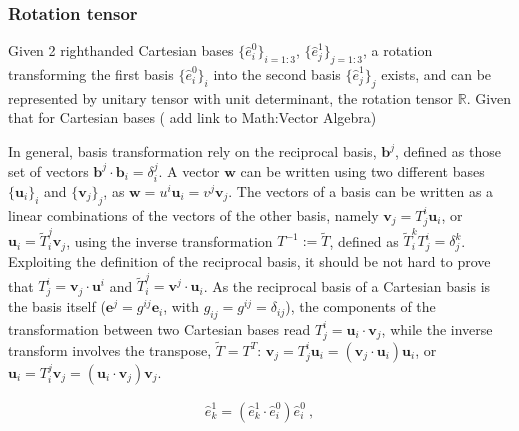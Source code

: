 \documentclass[letterpaper,10pt,english]{jupyterBook}
\begin{document}
\subsubsection{Rotation tensor}
\label{\detokenize{ch/kinematics-rotations-tensors:rotation-tensor}}\label{\detokenize{ch/kinematics-rotations-tensors:classical-mechanics-kinematics-rotations-tensor-components}}
\sphinxAtStartPar
Given 2 right\sphinxhyphen{}handed Cartesian bases \(\{ \hat{e}^0_i \}_{i=1:3}\), \(\{ \hat{e}^1_j \}_{j=1:3}\), a rotation transforming the first basis \(\{ \hat{e}^0_i \}_i\) into the second basis \(\{ \hat{e}^1_j \}_j\) exists, and can be represented by unitary tensor with unit determinant, the rotation tensor \(\mathbb{R}\).
Given that for Cartesian bases ( add link to Math:Vector Algebra)%
\begin{footnote}[1]\sphinxAtStartFootnote
In general, basis transformation rely on the reciprocal basis,
\(\mathbf{b}^j\), defined as those set of vectors \(\mathbf{b}^j \cdot \mathbf{b}_i = \delta_i^j\). A vector \(\mathbf{w}\) can be written using two different bases \(\{ \mathbf{u}_i \}_i\) and \(\{ \mathbf{v}_j \}_j\), as \(\mathbf{w} = u^i \mathbf{u}_i = v^j \mathbf{v}_j\). The vectors of a basis can be written as a linear combinations of the vectors of the other basis, namely \(\mathbf{v}_j = T^i_j \mathbf{u}_i\), or \(\mathbf{u}_i = \tilde{T}^{j}_i \mathbf{v}_j\), using the inverse transformation \(T^{-1} := \tilde{T}\), defined as \(\tilde{T}^k_i T^i_j = \delta^k_j\). Exploiting the definition of the reciprocal basis, it should be not hard to prove that \(T^i_j = \mathbf{v}_j \cdot \mathbf{u}^i\) and \(\tilde{T}^j_i = \mathbf{v}^j \cdot \mathbf{u}_i\). As the reciprocal basis of a Cartesian basis is the basis itself (\(\mathbf{e}^j = g^{ij} \mathbf{e}_i\), with \(g_{ij} = g^{ij} = \delta_{ij}\)), the components of the transformation between two Cartesian bases read \(T_j^i = \mathbf{u}_i \cdot \mathbf{v}_j\), while the inverse transform involves the transpose, \(\tilde{T} = T^T\): \(\mathbf{v}_j = T_j^i \mathbf{u}_i = \left( \mathbf{v}_j \cdot \mathbf{u}_i \right) \mathbf{u}_i\), or \(\mathbf{u}_i = T_i^j \mathbf{v}_j = \left( \mathbf{u}_i \cdot \mathbf{v}_j \right) \mathbf{v}_j\).
%
\end{footnote}
\begin{equation*}
\begin{split}\hat{e}_k^1 = \left( \hat{e}_k^1 \cdot \hat{e}^0_i \right) \hat{e}^0_i \ ,\end{split}
\end{equation*}
\end{document}
